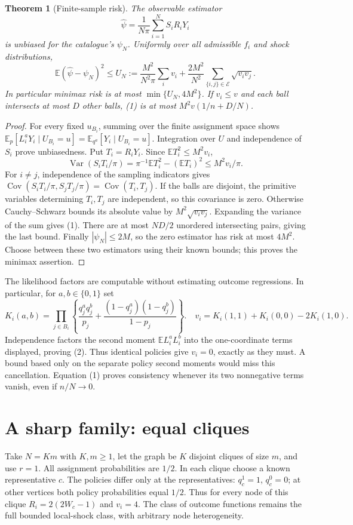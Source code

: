 \documentclass[11pt]{article}
\newtheorem{theorem}{Theorem}
\theoremstyle{remark}
\newcommand{\E}{\mathbb E}
\newcommand{\Var}{\operatorname{Var}}
\newcommand{\Cov}{\operatorname{Cov}}
\begin{document}
\begin{theorem}[Finite-sample risk]
The observable estimator
\[
 \widehat\psi=\frac1{N\pi}\sum_{i=1}^N S_iR_iY_i
\]
is unbiased for the catalogue's $\psi_N$. Uniformly over all admissible
$f_i$ and shock distributions,
\[
 \E(\widehat\psi-\psi_N)^2\leq
 U_N:=\frac{M^2}{N^2\pi}\sum_i v_i+
       \frac{2M^2}{N^2}\sum_{\{i,j\}\in\mathcal E}\sqrt{v_iv_j}. \tag{1}
\]
In particular minimax risk is at most $\min\{U_N,4M^2\}$. If $v_i\leq v$
and each ball intersects at most $D$ other balls, (1) is at most
$M^2v(1/n+D/N)$.
\end{theorem}
\begin{proof}
For every fixed $u_{B_i}$, summing over the finite assignment space
shows $\E_p[L_i^aY_i\mid U_{B_i}=u]=\E_{q^a}[Y_i\mid U_{B_i}=u]$.
Integration over $U$ and independence of $S_i$ prove unbiasedness.
Put $T_i=R_iY_i$. Since $\E T_i^2\leq M^2v_i$,
\[
 \Var(S_iT_i/\pi)
 =\pi^{-1}\E T_i^2-(\E T_i)^2\leq M^2v_i/\pi.
\]
For $i\ne j$, independence of the sampling indicators gives
$\Cov(S_iT_i/\pi,S_jT_j/\pi)=\Cov(T_i,T_j)$.
If the balls are disjoint, the primitive variables determining $T_i,T_j$
are independent, so this covariance is zero. Otherwise Cauchy--Schwarz
bounds its absolute value by $M^2\sqrt{v_iv_j}$. Expanding the variance
of the sum gives (1). There are at most $ND/2$ unordered intersecting
pairs, giving the last bound. Finally $|\psi_N|\leq2M$, so the zero
estimator has risk at most $4M^2$. Choose between these two estimators
using their known bounds; this proves the minimax assertion.
\end{proof}

The likelihood factors are computable without estimating outcome regressions.
In particular, for $a,b\in\{0,1\}$ set
\[
 K_i(a,b)=\prod_{j\in B_i}\left\{
 \frac{q_j^aq_j^b}{p_j}+
 \frac{(1-q_j^a)(1-q_j^b)}{1-p_j}\right\}.
 \quad v_i=K_i(1,1)+K_i(0,0)-2K_i(1,0). \tag{2}
\]
Independence factors the second moment $\E L_i^aL_i^b$ into the
one-coordinate terms displayed, proving (2). Thus identical policies give
$v_i=0$, exactly as they must. A bound based only on the separate policy
second moments would miss this cancellation. Equation (1) proves consistency
whenever its two nonnegative terms vanish, even if $n/N\to0$.

\section{A sharp family: equal cliques}
Take $N=Km$ with $K,m\geq1$, let the graph be $K$ disjoint cliques of
size $m$, and use $r=1$. All assignment probabilities are $1/2$. In each
clique choose a known representative $c$. The policies differ only at the
representatives: $q_c^1=1$, $q_c^0=0$; at other vertices both policy
probabilities equal $1/2$. Thus for every node of this clique
$R_i=2(2W_c-1)$ and $v_i=4$. The class of outcome functions remains the
full bounded local-shock class, with arbitrary node heterogeneity.
\end{document}
